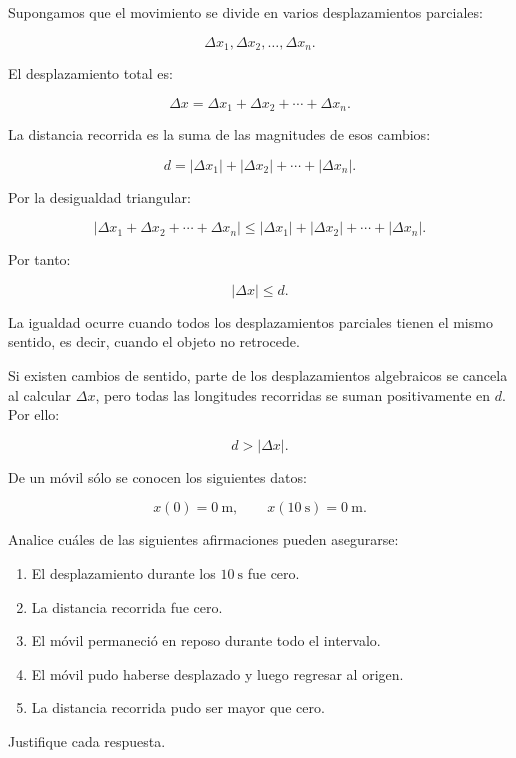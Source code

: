 \begin{explicacion}
Supongamos que el movimiento se divide en varios desplazamientos parciales:

\[
\Delta x_1,\Delta x_2,\ldots,\Delta x_n.
\]

El desplazamiento total es:

\[
\Delta x
=
\Delta x_1+\Delta x_2+\cdots+\Delta x_n.
\]

La distancia recorrida es la suma de las magnitudes de esos cambios:

\[
d
=
|\Delta x_1|
+
|\Delta x_2|
+\cdots+
|\Delta x_n|.
\]

Por la desigualdad triangular:

\[
|\Delta x_1+\Delta x_2+\cdots+\Delta x_n|
\leq
|\Delta x_1|
+
|\Delta x_2|
+\cdots+
|\Delta x_n|.
\]

Por tanto:

\[ \boxed{|\Delta x|\leq d}. \]

La igualdad ocurre cuando todos los desplazamientos parciales tienen el mismo sentido, es decir, cuando el objeto no retrocede.

Si existen cambios de sentido, parte de los desplazamientos algebraicos se cancela al calcular \(\Delta x\), pero todas las longitudes recorridas se suman positivamente en \(d\). Por ello:

\[ d>|\Delta x|. \]
\end{explicacion}


\begin{ejercicio}
De un móvil sólo se conocen los siguientes datos:

\[
x(0)=\SI{0}{\meter},
\qquad
x(\SI{10}{\second})=\SI{0}{\meter}.
\]

Analice cuáles de las siguientes afirmaciones pueden asegurarse:

\begin{enumerate}[label=\alph*)]
    \item El desplazamiento durante los \(\SI{10}{\second}\) fue cero.
    \item La distancia recorrida fue cero.
    \item El móvil permaneció en reposo durante todo el intervalo.
    \item El móvil pudo haberse desplazado y luego regresar al origen.
    \item La distancia recorrida pudo ser mayor que cero.
\end{enumerate}

Justifique cada respuesta.
\end{ejercicio}

